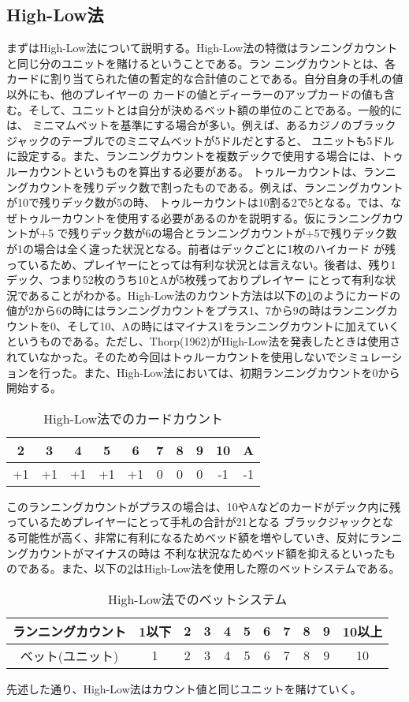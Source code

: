 \subsection{High-Low法}
まずはHigh-Low法について説明する。High-Low法の特徴はランニングカウントと同じ分のユニットを賭けるということである。ラン
ニングカウントとは、各カードに割り当てられた値の暫定的な合計値のことである。自分自身の手札の値以外にも、他のプレイヤーの
カードの値とディーラーのアップカードの値も含む。そして、ユニットとは自分が決めるベット額の単位のことである。一般的には、
ミニマムベットを基準にする場合が多い。例えば、あるカジノのブラックジャックのテーブルでのミニマムベットが5ドルだとすると、
ユニットも5ドルに設定する。また、ランニングカウントを複数デックで使用する場合には、トゥルーカウントというものを算出する必要がある。
トゥルーカウントは、ランニングカウントを残りデック数で割ったものである。例えば、ランニングカウントが10で残りデック数が5の時、
トゥルーカウントは10割る2で5となる。では、なぜトゥルーカウントを使用する必要があるのかを説明する。仮にランニングカウントが+5
で残りデック数が6の場合とランニングカウントが+5で残りデック数が1の場合は全く違った状況となる。前者はデックごとに1枚のハイカード
が残っているため、プレイヤーにとっては有利な状況とは言えない。後者は、残り1デック、つまり52枚のうち10とAが5枚残っておりプレイヤー
にとって有利な状況であることがわかる。High-Low法のカウント方法は以下の\ref{hlc}のようにカードの値が2から6の時にはランニングカウントをプラス1、7から9の時はランニングカウントを0、そして10、Aの時にはマイナス1をランニングカウントに加えていくというものである。ただし、Thorp(1962)がHigh-Low法を発表したときは使用されていなかった。そのため今回はトゥルーカウントを使用しないでシミュレーションを行った。また、High-Low法においては、初期ランニングカウントを0から開始する。
  \begin{table}[H]
    \centering
    \label{hlc}
    \caption{High-Low法でのカードカウント}
    \begin{tabular}{|c|c|c|c|c|c|c|c|c|c|} \hline
      2&3&4&5&6&7&8&9&10&A \\ \hline
      +1&+1&+1&+1&+1&0&0&0&-1&-1 \\ \hline
    \end{tabular}
  \end{table}
このランニングカウントがプラスの場合は、10やAなどのカードがデック内に残っているためプレイヤーにとって手札の合計が21となる
ブラックジャックとなる可能性が高く、非常に有利になるためベッド額を増やしていき、反対にランニングカウントがマイナスの時は
不利な状況なためベッド額を抑えるといったものである。また、以下の\ref{hlb}はHigh-Low法を使用した際のベットシステムである。
  \begin{table}[H]
    \centering
    \label{hlb}
    \caption{High-Low法でのベットシステム}
    \begin{tabular}{|c|c|c|c|c|c|c|c|c|c|c|} \hline
      ランニングカウント&1以下&2&3&4&5&6&7&8&9&10以上 \\ \hline
      ベット(ユニット)&1&2&3&4&5&6&7&8&9&10 \\ \hline
    \end{tabular}
  \end{table}
先述した通り、High-Low法はカウント値と同じユニットを賭けていく。

